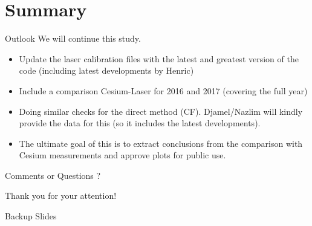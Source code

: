 \documentclass{beamer}
\begin{document}
\section{Summary}

\begin{frame}{Outlook}
We will continue this study.
  \begin{itemize}
  \item Update the laser calibration files with the latest and greatest version of the code (including latest developments by Henric)	  
\item Include a	comparison Cesium-Laser	for	2016 and 2017 (covering	the	full year)
 \item Doing	similar	checks	for	the	direct	method	(CF). Djamel/Nazlim	will kindly	provide	the	data for this (so it includes the latest	developments).
 \item The ultimate	goal of	this is	to extract conclusions from	the	comparison with	Cesium measurements and	approve	plots for	public use.
  \end{itemize}
\end{frame}

\begin{frame}{Comments or Questions ?}

\begin{center}\color{red}\Huge{Thank you for your attention!}
\end{center}



\end{frame}

\begin{frame}{}

\begin{center}\color{red}\Huge{Backup Slides}
\end{center}
\end{frame}
\end{document}

